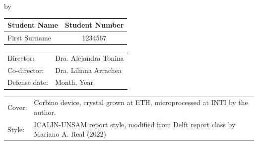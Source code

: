 \begin{titlepage}

\begin{center}

{\makeatletter
\largetitlestyle\fontsize{45}{45}\selectfont\@title
\makeatother}

{\makeatletter
\ifdefvoid{\@subtitle}{}{\bigskip\fontsize{20}{20}\selectfont\@subtitle}
\makeatother}

\bigskip
\bigskip

by

\bigskip
\bigskip

{\makeatletter
\largetitlestyle\fontsize{25}{25}\selectfont\@author
\makeatother}

\bigskip
\bigskip

\setlength\extrarowheight{2pt}
\begin{tabular}{lc}
    Student Name & Student Number \\\midrule
    First Surname & 1234567 \\
\end{tabular}

\vfill

\begin{tabular}{ll}
    Director: & Dra. Alejandra Tonina \\
    Co-director: & Dra. Liliana Arrachea \\
    Defense date: & Month, Year \\
\end{tabular}

\bigskip
\bigskip

\begin{tabular}{p{15mm}p{10cm}}
    Cover: & Corbino device, crystal grown at ETH, microprocessed at INTI by the author. \\
    Style: & ICALIN-UNSAM report style, modified from Delft report class by Mariano A. Real (2022)
\end{tabular}

\end{center}


\end{titlepage}
